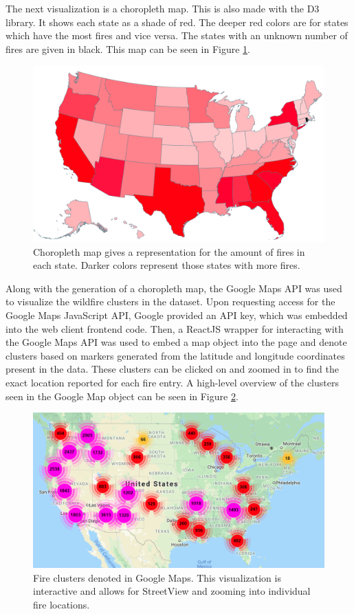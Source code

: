 \documentclass[conference]{IEEEtran}
\begin{document}
The next visualization is a choropleth map. This is also made with the D3 library. It shows each state as a shade of red. The deeper red colors are for states which have the most fires and vice versa. The states with an unknown number of fires are given in black. This map can be seen in Figure \ref{fig:choropleth}.

\begin{figure}
    \centering
    \includegraphics[scale=0.45]{img/choropleth.PNG}
    \caption{Choropleth map gives a representation for the amount of fires in each state. Darker colors represent those states with more fires.}
    \label{fig:choropleth}
\end{figure}

Along with the generation of a choropleth map, the Google Maps API was used to visualize the wildfire clusters in the dataset. Upon requesting access for the Google Maps JavaScript API, Google provided an API key, which was embedded into the web client frontend code. Then, a ReactJS wrapper for interacting with the Google Maps API was used to embed a map object into the page and denote clusters based on markers generated from the latitude and longitude coordinates present in the data. These clusters can be clicked on and zoomed in to find the exact location reported for each fire entry. A high-level overview of the clusters seen in the Google Map object can be seen in Figure \ref{fig:google_maps_clusters}.

\begin{figure}
    \centering
    \includegraphics[scale=0.44]{img/google_maps_clusters.PNG}
    \caption{Fire clusters denoted in Google Maps. This visualization is interactive and allows for StreetView and zooming into individual fire locations.}
    \label{fig:google_maps_clusters}
\end{figure}
\end{document}
